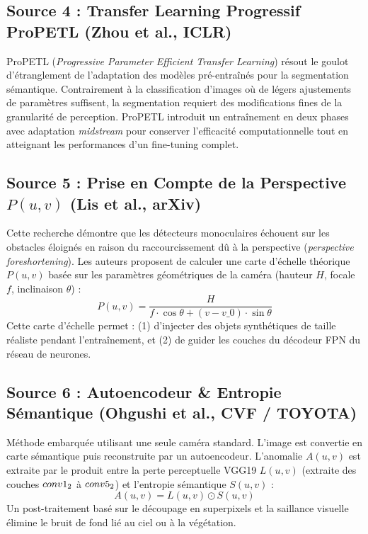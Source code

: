 \documentclass[11pt,a4paper]{article} \usepackage[utf8]{inputenc} \usepackage[T1]{fontenc}
\begin{document}
\subsection{Source 4 : Transfer Learning Progressif ProPETL (Zhou et al., ICLR) \cite{zhou2024propetl}}
ProPETL (\emph{Progressive Parameter Efficient Transfer Learning}) résout le goulot d'étranglement de
l'adaptation des modèles pré-entraînés pour la segmentation sémantique. Contrairement à la classification
d'images où de légers ajustements de paramètres suffisent, la segmentation requiert des modifications
fines de la granularité de perception. ProPETL introduit un entraînement en deux phases avec adaptation
\emph{midstream} pour conserver l'efficacité computationnelle tout en atteignant les performances d'un
fine-tuning complet.
\subsection{Source 5 : Prise en Compte de la Perspective $P(u,v)$ (Lis et al., arXiv) \cite{perspective2024}}
Cette recherche démontre que les détecteurs monoculaires échouent sur les obstacles éloignés en raison du
raccourcissement dû à la perspective (\emph{perspective foreshortening}). Les auteurs proposent de
calculer une carte d'échelle théorique $P(u,v)$ basée sur les paramètres géométriques de la caméra
(hauteur $H$, focale $f$, inclinaison $\theta$) :
\begin{equation} P(u,v) = \frac{H}{f \cdot \cos\theta + (v - v\_0) \cdot \sin\theta}
\end{equation} Cette carte d'échelle permet : (1) d'injecter des objets synthétiques de taille réaliste
pendant l'entraînement, et (2) de guider les couches du décodeur FPN du réseau de neurones.
\subsection{Source 6 : Autoencodeur \& Entropie Sémantique (Ohgushi et al., CVF / TOYOTA) \cite{toyota2024}}
Méthode embarquée utilisant une seule caméra standard. L'image est convertie en carte sémantique puis
reconstruite par un autoencodeur. L'anomalie $A(u,v)$ est extraite par le produit entre la perte
perceptuelle VGG19 $L(u,v)$ (extraite des couches $conv1\\_2$ à $conv5\\_2$) et l'entropie sémantique
$S(u,v)$ :
\begin{equation} A(u,v) = L(u,v) \odot S(u,v)
\end{equation} Un post-traitement basé sur le découpage en superpixels et la saillance visuelle élimine
le bruit de fond lié au ciel ou à la végétation.
\end{document}
